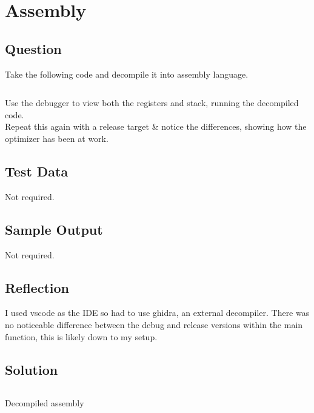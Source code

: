 \section{Assembly}
    \subsection*{Question}
        Take the following code and decompile it into assembly language.

        \inputminted{cpp}{../Tasks/03-Assembly/Assembly.cpp}

        Use the debugger to view both the registers and stack, 
        running the decompiled code.\\

        Repeat this again with a release target \& notice the differences,
        showing how the optimizer has been at work.

    \subsection*{Test Data}
        Not required.
        
    \subsection*{Sample Output}
        Not required.
    \subsection*{Reflection}
        I used vscode as the IDE so had to use ghidra, an external decompiler.
        There was no noticeable difference between the debug and release versions within the main function, 
        this is likely down to my setup.

    \subsection*{Solution}
        \begin{listing}[H]            
            {\renewcommand\fcolorbox[4][]{\textcolor{cyan}{\strut#4}}
                \inputminted[fontsize=\tiny]{gas}{../Tasks/03-Assembly/Assembly.txt}
                \caption{Decompiled assembly}
            }
        \end{listing}